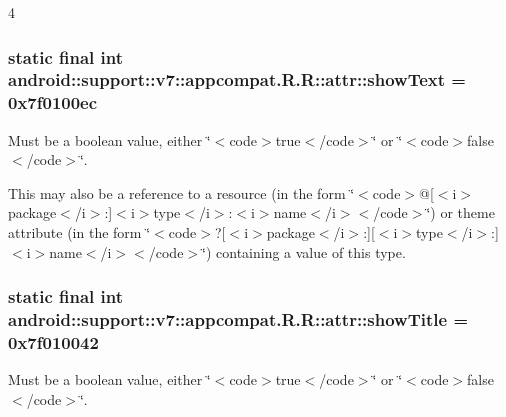 4\hypertarget{classandroid_1_1support_1_1v7_1_1appcompat_1_1_r_1_1attr_654187859fe9075abf56d57a4c19b996}{
\subsubsection[{showText}]{\setlength{\rightskip}{0pt plus 5cm}static final int android::support::v7::appcompat.R.R::attr::showText = 0x7f0100ec}}
\label{classandroid_1_1support_1_1v7_1_1appcompat_1_1_r_1_1attr_654187859fe9075abf56d57a4c19b996}


Must be a boolean value, either \char`\"{}$<$code$>$true$<$/code$>$\char`\"{} or \char`\"{}$<$code$>$false$<$/code$>$\char`\"{}. 

This may also be a reference to a resource (in the form \char`\"{}$<$code$>$@\mbox{[}$<$i$>$package$<$/i$>$:\mbox{]}$<$i$>$type$<$/i$>$:$<$i$>$name$<$/i$>$$<$/code$>$\char`\"{}) or theme attribute (in the form \char`\"{}$<$code$>$?\mbox{[}$<$i$>$package$<$/i$>$:\mbox{]}\mbox{[}$<$i$>$type$<$/i$>$:\mbox{]}$<$i$>$name$<$/i$>$$<$/code$>$\char`\"{}) containing a value of this type. \hypertarget{classandroid_1_1support_1_1v7_1_1appcompat_1_1_r_1_1attr_aaced62e0592c6706f744dc93298942d}{
\subsubsection[{showTitle}]{\setlength{\rightskip}{0pt plus 5cm}static final int android::support::v7::appcompat.R.R::attr::showTitle = 0x7f010042}}
\label{classandroid_1_1support_1_1v7_1_1appcompat_1_1_r_1_1attr_aaced62e0592c6706f744dc93298942d}


Must be a boolean value, either \char`\"{}$<$code$>$true$<$/code$>$\char`\"{} or \char`\"{}$<$code$>$false$<$/code$>$\char`\"{}. 

